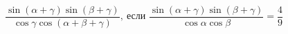 \begin{ex}[type=equation]
	\begin{condition}
		$\ \dfrac{\sin {(\alpha + \gamma)\sin {(\beta + \gamma)}}}{\cos \gamma \cos {(\alpha+\beta + \gamma)}},\ $если $\dfrac{\sin{(\alpha + \gamma)}\sin {(\beta+\gamma)}}{\cos \alpha\cos\beta} = \dfrac{4}{9}$
	\end{condition}
\end{ex}